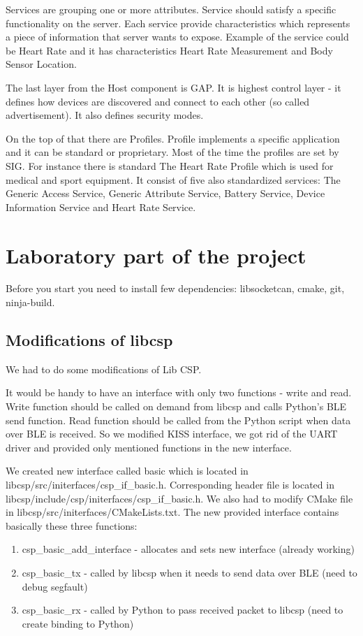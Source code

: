 \documentclass[conference]{IEEEtran}
\begin{document}
Services are grouping one or more attributes. Service should satisfy a specific functionality on the server. Each service provide characteristics which represents a piece of information that server wants to expose. Example of the service could be Heart Rate and it has characteristics Heart Rate Measurement and Body Sensor Location.

The last layer from the Host component is GAP. It is highest control layer - it defines how devices are discovered and connect to each other (so called advertisement). It also defines security modes.

On the top of that there are Profiles. Profile implements a specific application and it can be standard or proprietary. Most of the time the profiles are set by SIG. For instance there is standard The Heart Rate Profile which is used for medical and sport equipment. It consist of five also standardized services: The Generic Access Service, Generic Attribute Service, Battery Service, Device Information Service and Heart Rate Service. \cite{embeddedcentric}

\section{Laboratory part of the project}
Before you start you need to install few dependencies: libsocketcan, cmake, git, ninja-build.
\subsection{Modifications of libcsp}
We had to do some modifications of Lib CSP.

It would be handy to have an interface with only two functions - write and read. Write function should be called on demand from libcsp and calls Python's BLE send function. Read function should be called from the Python script when data over BLE is received. So we modified KISS interface, we got rid of the UART driver and provided only mentioned functions in the new interface.
 
We created new interface called basic which is located in libcsp/src/initerfaces/csp\_if\_basic.h. Corresponding header file is located in libcsp/include/csp/initerfaces/csp\_if\_basic.h. We also had to modify CMake file in libcsp/src/initerfaces/CMakeLists.txt.
The new provided interface contains basically these three functions:
\begin{enumerate}
	\item csp\_basic\_add\_interface - allocates and sets new interface (already working)
	\item csp\_basic\_tx - called by libcsp when it needs to send data over BLE (need to debug segfault)
	\item csp\_basic\_rx - called by Python to pass received packet to libcsp (need to create binding to Python)
\end{enumerate}
\end{document}
